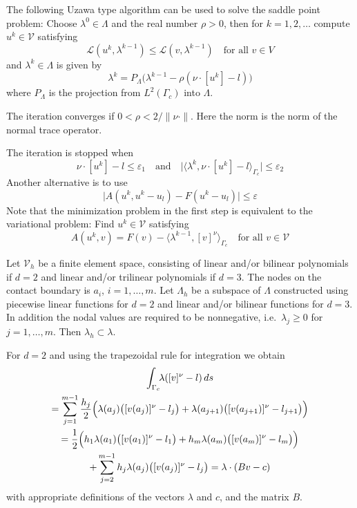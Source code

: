 \documentclass[12pt,a4paper]{article}
\numberwithin{equation}{section}
\numberwithin{table}{section}
\numberwithin{figure}{section}
\newcommand{\V}{\ensuremath{\mathcal{V}}}
\newcommand{\Lagrange}{\ensuremath{\mathcal L}}
\newcommand{\intG}[1][0]{\int_{\Gamma_{#1}}\!\!}
\newcommand{\intGc}{\intG[c]}
\renewcommand{\epsilon}{\varepsilon}
\providecommand{\abs}[1]{\lvert #1 \rvert}
\providecommand{\norm}[1]{\lVert #1 \rVert}
\providecommand{\dualp}[2]{\langle #1, #2 \rangle}
\newcommand{\ds}{{\,ds}}
\newcommand{\qforall}{\quad\text{for all }}
\begin{document}
The following Uzawa type algorithm can be used to solve the saddle point problem: Choose
$\lambda^0 \in \Lambda$ and the real number $\rho > 0$, then for $k=1,2,\ldots$ compute
$u^k\in\V$ satisfying
\begin{equation}
  \Lagrange(u^k, \lambda^{k-1}) \le \Lagrange(v, \lambda^{k-1})
  \qforall v \in V
\end{equation}
and $\lambda^k\in \Lambda$ is given by
\begin{equation}
  \lambda^k = P_\Lambda \bigl(\lambda^{k-1} - \rho (\nu\cdot [u^k] - l) \bigr)
\end{equation}
where $P_\Lambda$ is the projection from $L^2(\Gamma_c)$ into $\Lambda$.

The iteration converges if $0 < \rho < 2/\norm{\nu\cdot}$. Here the
norm is the norm of the normal trace operator.

The iteration is stopped when
\begin{equation}
  \nu\cdot [u^k] -l \le \epsilon_1 \quad\text{and}\quad
  \abs{\dualp{\lambda^k}{\nu\cdot [u^k] -l}_{\Gamma_c}} \le \epsilon_2 
\end{equation}
Another alternative is to use
\begin{equation}
  \abs{A(u^k, u^k-u_l) - F(u^k - u_l)} \le \epsilon
\end{equation}
Note that the minimization problem in the first step is equivalent to the variational
problem: Find $u^k\in \V$ satisfying
\begin{equation}
  A(u^k, v) = F(v) - \dualp{\lambda^{k-1}}{[v]^\nu}_{\Gamma_c}
  \qforall v\in \V
\end{equation}


Let $\V_h$ be a finite element space, consisting of linear and/or bilinear polynomials if
$d=2$ and linear and/or trilinear polynomials if $d=3$.  The nodes on the contact boundary
is $a_i$, $i=1,\ldots,m$.  Let $\Lambda_h$ be a subspace of $\Lambda$ constructed using
piecewise linear functions for $d=2$ and linear and/or bilinear functions for $d=3$.  In
addition the nodal values are required to be nonnegative, i.e.~$\lambda_j\ge 0$ for
$j=1,\ldots,m$. Then $\lambda_h\subset \lambda$.

For $d=2$ and using the trapezoidal rule for integration we obtain
\begin{multline}
  \intGc \lambda([v]^\nu-l) \ds \\
  = \sum_{j=1}^{m-1} \frac{h_j}{2}\Bigl(\lambda(a_j)\bigl([v(a_j)]^\nu-l_j\bigr)
  + \lambda(a_{j+1})\bigl([v(a_{j+1})]^\nu-l_{j+1}\bigr)\Bigr) \\
  = \frac{1}{2} \Bigl( h_1\lambda(a_1)\bigl([v(a_1)]^\nu - l_1 \bigr)
  +  h_m\lambda(a_m)\bigl([v(a_m)]^\nu - l_m \bigr) \Bigr) \\
  + \sum_{j=2}^{m-1} h_j \lambda(a_j)\bigl([v(a_j)]^\nu-l_j\bigr)
  = \lambda\cdot(Bv - c)
\end{multline}
with appropriate definitions of the vectors $\lambda$ and $c$, and the matrix $B$.
\end{document}
